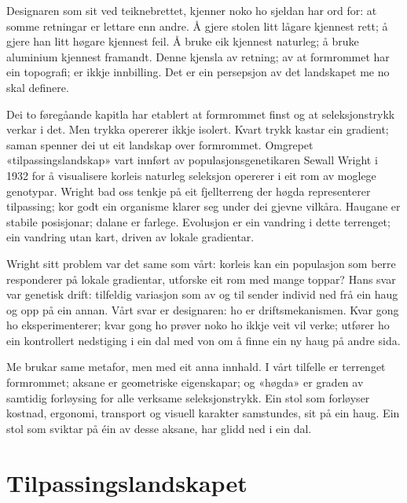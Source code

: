 

Designaren som sit ved teiknebrettet, kjenner noko ho sjeldan har ord for: at somme retningar er lettare enn andre. Å gjere stolen litt lågare kjennest rett; å gjere han litt høgare kjennest feil. Å bruke eik kjennest naturleg; å bruke aluminium kjennest framandt. Denne kjensla av retning; av at formrommet har ein topografi; er ikkje innbilling. Det er ein persepsjon av det landskapet me no skal definere.

Dei to føregåande kapitla har etablert at formrommet finst og at seleksjonstrykk verkar i det. Men trykka opererer ikkje isolert. Kvart trykk kastar ein gradient; saman spenner dei ut eit landskap over formrommet. Omgrepet «tilpassingslandskap» vart innført av populasjonsgenetikaren Sewall Wright i 1932 for å visualisere korleis naturleg seleksjon opererer i eit rom av moglege genotypar. Wright bad oss tenkje på eit fjellterreng der høgda representerer tilpassing; kor godt ein organisme klarer seg under dei gjevne vilkåra. Haugane er stabile posisjonar; dalane er farlege. Evolusjon er ein vandring i dette terrenget; ein vandring utan kart, driven av lokale gradientar.

Wright sitt problem var det same som vårt: korleis kan ein populasjon som berre responderer på lokale gradientar, utforske eit rom med mange toppar? Hans svar var genetisk drift: tilfeldig variasjon som av og til sender individ ned frå ein haug og opp på ein annan. Vårt svar er designaren: ho er driftsmekanismen. Kvar gong ho eksperimenterer; kvar gong ho prøver noko ho ikkje veit vil verke; utfører ho ein kontrollert nedstiging i ein dal med von om å finne ein ny haug på andre sida.

Me brukar same metafor, men med eit anna innhald. I vårt tilfelle er terrenget formrommet; aksane er geometriske eigenskapar; og «høgda» er graden av samtidig forløysing for alle verksame seleksjonstrykk. Ein stol som forløyser kostnad, ergonomi, transport og visuell karakter samstundes, sit på ein haug. Ein stol som sviktar på éin av desse aksane, har glidd ned i ein dal.

\section*{Tilpassingslandskapet}

